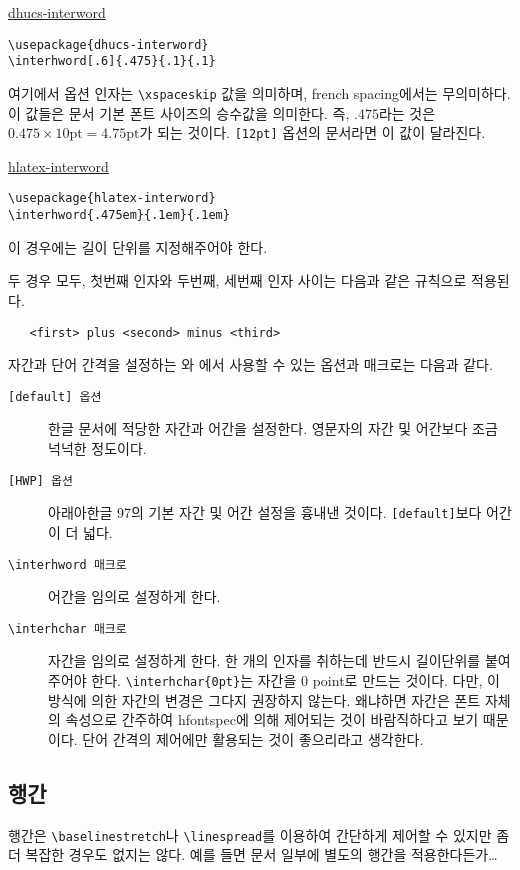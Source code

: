 \noindent\underline{dhucs-interword}
\begin{verbatim}
\usepackage{dhucs-interword}
\interhword[.6]{.475}{.1}{.1}
\end{verbatim}
여기에서 옵션 인자는 \verb|\xspaceskip| 값을 의미하며, french
spacing에서는 무의미하다. 이 값들은 문서 기본 폰트 사이즈의
승수값을 의미한다. 즉, $.475$라는 것은 $0.475\times 10\mbox{pt} = 4.75\mbox{pt}$가
되는 것이다. \texttt{[12pt]} 옵션의 문서라면 이 값이 달라진다.

\medskip

\noindent\underline{hlatex-interword}
\begin{verbatim}
\usepackage{hlatex-interword}
\interhword{.475em}{.1em}{.1em}
\end{verbatim}
이 경우에는 길이 단위를 지정해주어야 한다.

두 경우 모두, 첫번째 인자와 두번째, 세번째 인자 사이는 다음과 같은
규칙으로 적용된다.
\begin{verbatim}
   <first> plus <second> minus <third>
\end{verbatim}

자간과 단어 간격을 설정하는 와 
에서 사용할 수 있는 옵션과 매크로는 다음과 같다.
\begin{description}
\item[\texttt{[default] 옵션}] 한글 문서에 적당한 자간과 어간을
설정한다. 영문자의 자간 및 어간보다 조금 넉넉한 정도이다.
\item[\texttt{[HWP] 옵션}] 아래아한글 97의 기본 자간 및 어간 설정을
흉내낸 것이다. \texttt{[default]}보다 어간이 더 넓다.
\item[\texttt{\textbackslash interhword 매크로}]
 어간을 임의로 설정하게 한다.
\item[\texttt{\textbackslash interhchar 매크로}]
 자간을 임의로 설정하게 한다. 한 개의 인자를 취하는데 반드시 길이단위를
 붙여주어야 한다. \verb|\interhchar{0pt}|는 자간을 0 point로
 만드는 것이다. 다만, 이 방식에 의한 자간의 변경은 그다지 권장하지 않는다.
 왜냐하면 자간은 폰트 자체의 속성으로 간주하여 hfontspec에 의해 제어되는
 것이 바람직하다고 보기 때문이다. \는 단어 간격의
 제어에만 활용되는 것이 좋으리라고 생각한다.
\end{description}

\subsection{행간}\label{sec:setspace}

행간은 \verb|\baselinestretch|나 \verb|\linespread|를 이용하여
간단하게 제어할 수 있지만 좀더 복잡한 경우도 없지는 않다. 예를 들면
문서 일부에 별도의 행간을 적용한다든가\ldots

